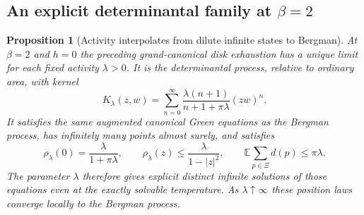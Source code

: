\documentclass[11pt,a4paper]{article}
\numberwithin{equation}{section}
\newtheorem{proposition}[theorem]{Proposition}
\theoremstyle{definition}
\theoremstyle{remark}
\begin{document}
\subsection{An explicit determinantal family at \texorpdfstring{$\beta=2$}{beta=2}}

\begin{proposition}[Activity interpolates from dilute infinite states to Bergman]
\label{prop:explicit-szego-activity-states}
At $\beta=2$ and $h=0$ the preceding grand-canonical disk exhaustion has
a unique limit for each fixed activity $\lambda>0$.  It is the
determinantal process, relative to ordinary area, with kernel
\begin{equation}\label{eq:explicit-szego-activity-kernel}
 K_\lambda(z,w)=\sum_{n=0}^{\infty}
       \frac{\lambda(n+1)}{n+1+\pi\lambda}(z\overline w)^n.
\end{equation}
It satisfies the same augmented canonical Green equations as the Bergman
process, has infinitely many points almost surely, and satisfies
\[
 \rho_\lambda(0)=\frac{\lambda}{1+\pi\lambda},\qquad
 \rho_\lambda(z)\le\frac{\lambda}{1-|z|^2},\qquad
 \mathbb E\sum_{p\in\Xi}d(p)\le\pi\lambda.
\]
The parameter $\lambda$ therefore gives explicit distinct infinite
solutions of those equations even at the exactly solvable temperature.
As $\lambda\uparrow\infty$ these position laws converge locally to the
Bergman process.
\end{proposition}
\end{document}
